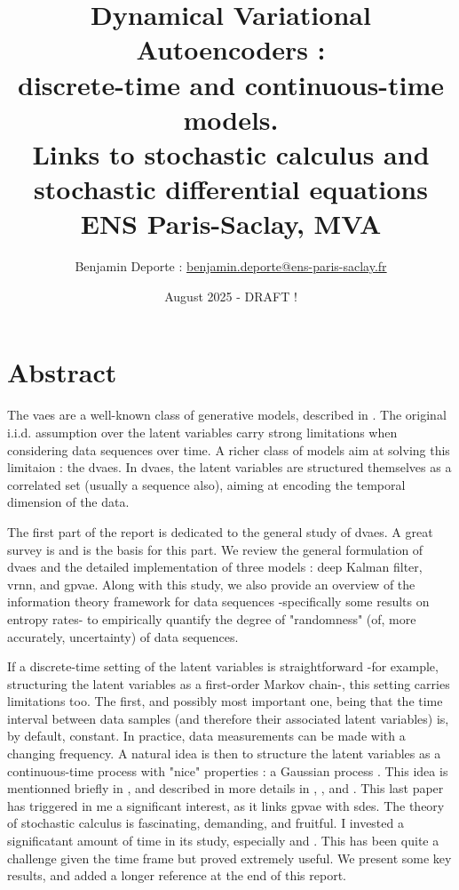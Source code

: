 \documentclass[twoside,11pt]{report}
\title{Dynamical Variational Autoencoders :\\ discrete-time and continuous-time models.\\ Links to stochastic calculus and stochastic differential equations\\
\vspace{2cm}
{\Large{ENS Paris-Saclay, MVA}}}
\author{
Benjamin Deporte : \href{mailto:benjamin.deporte@ens-paris-saclay.fr}{benjamin.deporte@ens-paris-saclay.fr}%
}
\date{August 2025 - DRAFT !}
\begin{document}
\everymath{\displaystyle}
\maketitle
\chapter*{Abstract}

The \glspl{vae} are a well-known class of generative models, described in \cite{kingma_introduction_2019}. The original i.i.d.
assumption over the latent variables carry strong limitations when considering data sequences over time. A richer
class of models aim at solving this limitaion : the \glspl{dvae}. In \glspl{dvae}, the latent variables are structured themselves as a correlated set (usually a sequence also),
 aiming at encoding the temporal dimension of the data. 

The first part of the report is dedicated to the general study of \glspl{dvae}. A great survey is \cite{girin_dynamical_2022} and is the basis for this part. 
We review the general formulation of \glspl{dvae} and the detailed implementation of three models :  deep Kalman filter, \gls{vrnn}, and \gls{gpvae}. 
Along with this study, we also provide an overview of the information theory framework for data sequences -specifically some results on entropy rates-
 to empirically  quantify the degree of "randomness" (of, more accurately, uncertainty) of data sequences.


If a discrete-time setting of the latent variables is straightforward -for example, structuring the latent variables as a first-order Markov chain-, this setting carries limitations too. 
The first, and possibly most important one, being that the time interval between data samples (and therefore their associated latent variables) is, by default, constant. In practice, data measurements can be made 
with a changing frequency. A natural idea is then to structure the latent variables as a continuous-time process with "nice" properties : a Gaussian process \cite{rasmussen_gaussian_2008}. 
This idea is mentionned briefly in \cite{girin_dynamical_2022}, and described in more details in \cite{casale_gaussian_2018}, \cite{fortuin_gp-vae:_2020}, \cite{titsias_bayesian_2010} and \cite{zhu_markovian_2023}. 
This last paper has triggered in me a significant interest, as it links \gls{gpvae} with \glspl{sde}. The theory of stochastic calculus is fascinating, demanding, and fruitful.
I invested a significatant amount of time in its study, especially \cite{mouvement-brownien-calcul-ito} and \cite{sarkka_applied_2019}.
This has been quite a challenge given the time frame but proved extremely useful. We present some key results,
and added a longer reference at the end of this report.
\end{document}
